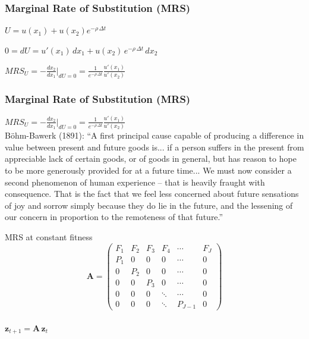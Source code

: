 \documentclass{beamer}
\begin{document}
\begin{frame}
  \frametitle{Marginal Rate of Substitution (MRS)}
  $U = u(x_1) + u(x_2) e^{-\rho \, \Delta t}$\\
  \vspace{.5cm}
  \pause

  $0 = dU = u'(x_1) \, dx_1 + u(x_2) \, e^{-\rho \, \Delta t} \, dx_2$
  \vspace{.5cm}
  \pause

  $MRS_{U} = -\frac{dx_2}{dx_1} \bigg\rvert_{dU=0} = \frac{1}{e^{-\rho \, \Delta t}} \frac{u'(x_1)}{u'(x_2)}$ 
\end{frame}

\begin{frame}
  \frametitle{Marginal Rate of Substitution (MRS)}
  $MRS_{U} = -\frac{dx_2}{dx_1} \bigg\rvert_{dU=0} = \frac{1}{e^{-\rho \, \Delta t}} \frac{u'(x_1)}{u'(x_2)}$ \\
  \vspace{.5cm}
  B\"{o}hm-Bawerk (1891): ``A first principal cause capable of producing a difference in value between present and future goods is... if a person suffers in the present from appreciable lack of certain goods, or of goods in general, but has reason to hope to be more generously provided for at a future time... We must now consider a second phenomenon of human experience -- that is heavily fraught with consequence. That is the fact that we feel less concerned about future sensations of joy and sorrow simply because they do lie in the future, and the lessening of our concern in proportion to the remoteness of that future.''
\end{frame}

\begin{frame}{MRS at constant fitness}
\centering
\begin{equation*}
	\label{eq:A}
	\mathbf{A} = 
	\left( \begin{array}{cccccc}
		F_1 & F_2 & F_3 & F_4    & \cdots  & F_{J}   \\
		P_1 & 0   & 0   & 0      & \cdots  & 0       \\
		0   & P_2 & 0   & 0      & \cdots  & 0       \\
		0   & 0   & P_3 & 0      & \cdots  & 0       \\
		0   & 0   & 0   & \ddots & \cdots  & 0       \\
		0   & 0   & 0   & \ddots & P_{J-1} & 0
	\end{array} \right)
\end{equation*}
\\
\pause
\vspace{1.5cm}
$\mathbf{z}_{t+1} = \mathbf{A} \, \mathbf{z}_t$
\end{frame}
\end{document}
